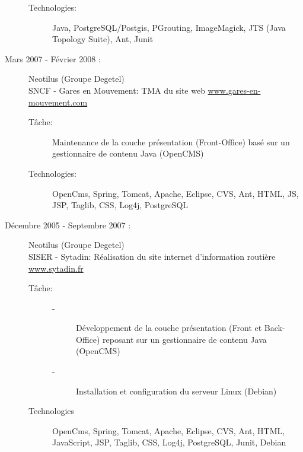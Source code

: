 \documentclass[11pt, oneside, a4paper, french]{article}
\begin{document}
\begin{description}
\begin{description}
  \item[Technologies:] Java, PostgreSQL/Postgis, PGrouting, ImageMagick, JTS (Java Topology Suite), Ant, Junit
  \end{description}
  
\item[Mars 2007 - F\'evrier 2008 :] Neotilus (Groupe Degetel)\\
  SNCF - Gares en Mouvement: TMA du site web \href{http://www.gares-en-mouvement.com}{www.gares-en-mouvement.com}
  \begin{description}
  \item[T\^ache:] Maintenance de la couche pr\'esentation (Front-Office) bas\'e sur un gestionnaire de contenu Java (OpenCMS)
    
  \item[Technologies:] OpenCms, Spring, Tomcat, Apache, Eclipse, CVS, Ant, HTML, JS, JSP, Taglib, CSS, Log4j, PostgreSQL
    
    
  \end{description}

\item[D\'ecembre 2005 - Septembre 2007 :] Neotilus (Groupe Degetel)\\
  SISER - Sytadin: R\'ealisation du site internet d'information routi\`ere \href{http://www.sytadin.fr}{www.sytadin.fr}
  \begin{description}
  \item[T\^ache:]
    \begin{description}
    \item[-] D\'eveloppement de la couche pr\'esentation (Front et Back-Office) reposant sur un gestionnaire de contenu Java (OpenCMS)
    \item[-]Installation et configuration du serveur Linux (Debian)
    \end{description}

  \item[Technologies]  OpenCms, Spring, Tomcat, Apache, Eclipse, CVS, Ant, HTML, JavaScript, JSP, Taglib, CSS, Log4j, PostgreSQL, Junit, Debian
  \end{description}


\end{description}
\end{document}

